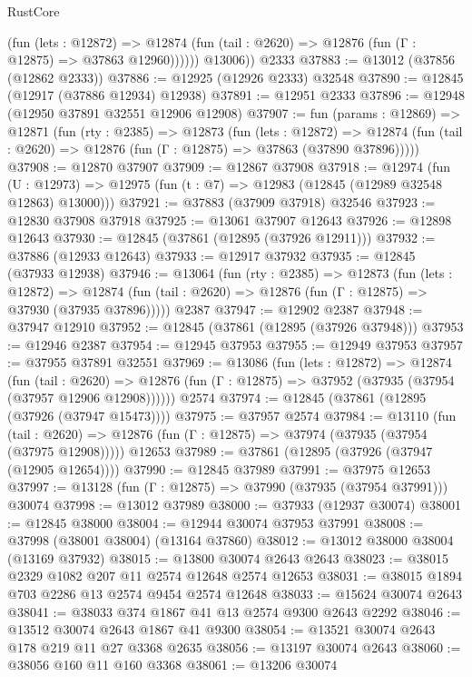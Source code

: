 \begin{lexlean}{RustCore}
\begin{coremodule}
              (fun (lets : @12872) =>
              @12874 (fun (tail : @2620) => @12876 (fun (Γ : @12875) => @37863 @12960))))))
        @13006))
    @2333
@37883 := @13012 (@37856 (@12862 @2333))
@37886 := @12925 (@12926 @2333) @32548
@37890 := @12845 (@12917 (@37886 @12934) @12938)
@37891 := @12951 @2333
@37896 := @12948 (@12950 @37891 @32551 @12906 @12908)
@37907 := fun (params : @12869) =>
  @12871
    (fun (rty : @2385) =>
    @12873
      (fun (lets : @12872) =>
      @12874 (fun (tail : @2620) => @12876 (fun (Γ : @12875) => @37863 (@37890 @37896)))))
@37908 := @12870 @37907
@37909 := @12867 @37908
@37918 := @12974
    (fun (U : @12973) => @12975 (fun (t : @7) => @12983 (@12845 (@12989 @32548 @12863) @13000)))
@37921 := @37883 (@37909 @37918) @32546
@37923 := @12830 @37908 @37918
@37925 := @13061 @37907 @12643
@37926 := @12898 @12643
@37930 := @12845 (@37861 (@12895 (@37926 @12911)))
@37932 := @37886 (@12933 @12643)
@37933 := @12917 @37932
@37935 := @12845 (@37933 @12938)
@37946 := @13064
    (fun (rty : @2385) =>
    @12873
      (fun (lets : @12872) =>
      @12874 (fun (tail : @2620) => @12876 (fun (Γ : @12875) => @37930 (@37935 @37896)))))
    @2387
@37947 := @12902 @2387
@37948 := @37947 @12910
@37952 := @12845 (@37861 (@12895 (@37926 @37948)))
@37953 := @12946 @2387
@37954 := @12945 @37953
@37955 := @12949 @37953
@37957 := @37955 @37891 @32551
@37969 := @13086
    (fun (lets : @12872) =>
    @12874
      (fun (tail : @2620) =>
      @12876 (fun (Γ : @12875) => @37952 (@37935 (@37954 (@37957 @12906 @12908))))))
    @2574
@37974 := @12845 (@37861 (@12895 (@37926 (@37947 @15473))))
@37975 := @37957 @2574
@37984 := @13110
    (fun (tail : @2620) => @12876 (fun (Γ : @12875) => @37974 (@37935 (@37954 (@37975 @12908)))))
    @12653
@37989 := @37861 (@12895 (@37926 (@37947 (@12905 @12654))))
@37990 := @12845 @37989
@37991 := @37975 @12653
@37997 := @13128 (fun (Γ : @12875) => @37990 (@37935 (@37954 @37991))) @30074
@37998 := @13012 @37989
@38000 := @37933 (@12937 @30074)
@38001 := @12845 @38000
@38004 := @12944 @30074 @37953 @37991
@38008 := @37998 (@38001 @38004) (@13164 @37860)
@38012 := @13012 @38000 @38004 (@13169 @37932)
@38015 := @13800 @30074 @2643 @2643
@38023 := @38015 @2329 @1082 @207 @11 @2574 @12648 @2574 @12653
@38031 := @38015 @1894 @703 @2286 @13 @2574 @9454 @2574 @12648
@38033 := @15624 @30074 @2643
@38041 := @38033 @374 @1867 @41 @13 @2574 @9300 @2643 @2292
@38046 := @13512 @30074 @2643 @1867 @41 @9300
@38054 := @13521 @30074 @2643 @178 @219 @11 @27 @3368 @2635
@38056 := @13197 @30074 @2643
@38060 := @38056 @160 @11 @160 @3368
@38061 := @13206 @30074

\end{coremodule}
\end{lexlean}
